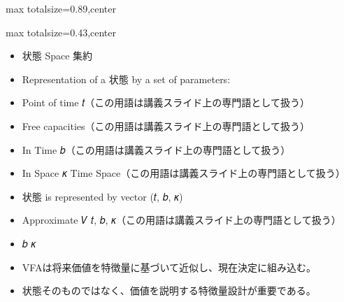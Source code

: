 \begin{minipage}[t]{0.58\textwidth}
\begin{adjustbox}{max totalsize={\textwidth}{0.89\textheight},center}
\begin{minipage}{\textwidth}
\end{minipage}
\end{adjustbox}
\end{minipage}


\clearpage
{}
\begin{minipage}[t]{0.405\textwidth}
\begin{adjustbox}{max totalsize={\textwidth}{0.43\textheight},center}
\begin{minipage}{\textwidth}\scriptsize
{}\begin{itemize}
\item 状態 Space 集約
\item Representation of a 状態 by a set of parameters:
\item Point of time 𝑡（この用語は講義スライド上の専門語として扱う）
\item Free capacities（この用語は講義スライド上の専門語として扱う）
\item In Time 𝑏（この用語は講義スライド上の専門語として扱う）
\item In Space 𝜅 Time Space（この用語は講義スライド上の専門語として扱う）
\item 状態 is represented by vector (𝑡, 𝑏, 𝜅)
\item Approximate 𝑉 𝑡, 𝑏, 𝜅（この用語は講義スライド上の専門語として扱う）
\item 𝑏 𝜅
\end{itemize}\begin{itemize}
\item VFAは将来価値を特徴量に基づいて近似し、現在決定に組み込む。
\item 状態そのものではなく、価値を説明する特徴量設計が重要である。
\end{itemize}
\end{minipage}
\end{adjustbox}
\end{minipage}\hfill
